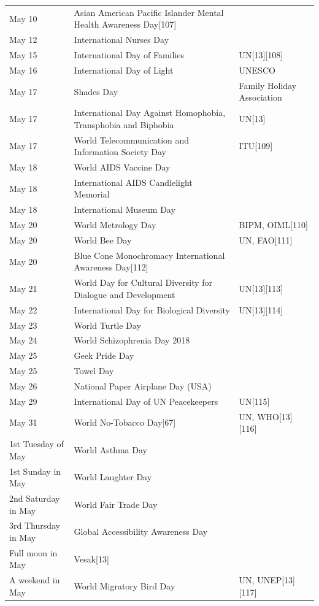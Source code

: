\documentclass[
]{book}
\begin{document}
\begin{longtable}[t]{>{\raggedright\arraybackslash}p{8em}>{\raggedright\arraybackslash}p{20em}>{\raggedright\arraybackslash}p{12em}}
May 10 & Asian American Pacific Islander Mental Health Awareness Day[107] & \\
\addlinespace
May 12 & International Nurses Day & \\
May 15 & International Day of Families & UN[13][108]\\
May 16 & International Day of Light & UNESCO\\
May 17 & Shades Day & Family Holiday Association\\
May 17 & International Day Against Homophobia, Transphobia and Biphobia & UN[13]\\
\addlinespace
May 17 & World Telecommunication and Information Society Day & ITU[109]\\
May 18 & World AIDS Vaccine Day & \\
May 18 & International AIDS Candlelight Memorial & \\
May 18 & International Museum Day & \\
May 20 & World Metrology Day & BIPM, OIML[110]\\
\addlinespace
May 20 & World Bee Day & UN, FAO[111]\\
May 20 & Blue Cone Monochromacy International Awareness Day[112] & \\
May 21 & World Day for Cultural Diversity for Dialogue and Development & UN[13][113]\\
May 22 & International Day for Biological Diversity & UN[13][114]\\
May 23 & World Turtle Day & \\
\addlinespace
May 24 & World Schizophrenia Day 2018 & \\
May 25 & Geek Pride Day & \\
May 25 & Towel Day & \\
May 26 & National Paper Airplane Day (USA) & \\
May 29 & International Day of UN Peacekeepers & UN[115]\\
\addlinespace
May 31 & World No-Tobacco Day[67] & UN, WHO[13][116]\\
1st Tuesday of May & World Asthma Day & \\
1st Sunday in May & World Laughter Day & \\
2nd Saturday in May & World Fair Trade Day & \\
3rd Thursday in May & Global Accessibility Awareness Day & \\
\addlinespace
Full moon in May & Vesak[13] & \\
A weekend in May & World Migratory Bird Day & UN, UNEP[13][117]\\

\end{longtable}
\end{document}
